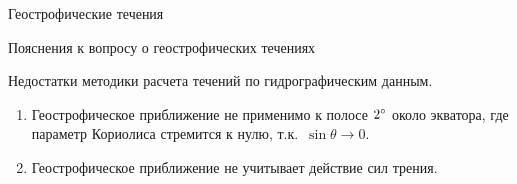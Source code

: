 \begin{chapter}{Геострофические течения}
\begin{section}{Пояснения к вопросу о геострофических течениях}
\begin{paragraph}{Недостатки методики расчета течений по гидрографическим данным.}
\begin{enumerate}
\item 
Геострофическое приближение не применимо к полосе ${2}^\circ$ около экватора,
где параметр Кориолиса стремится к нулю, т.к.~$\sin \theta \to 0$.

\item
Геострофическое приближение не учитывает действие сил трения.


\end{enumerate}
\end{paragraph}



\end{section}
\end{chapter}
